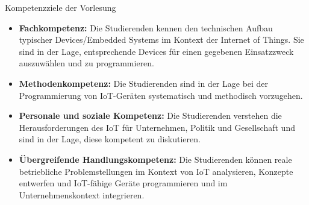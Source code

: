 \begin{frame}{Kompetenzziele der Vorlesung}
    \begin{itemize}
        \item \textbf{Fachkompetenz:} Die Studierenden kennen den technischen Aufbau typischer
        Devices/Embedded Systems im Kontext der Internet of Things. Sie sind in der Lage,
        entsprechende Devices für einen gegebenen Einsatzzweck auszuwählen und zu programmieren.
        \medskip

        \item \textbf{Methodenkompetenz:} Die Studierenden sind in der Lage bei der Programmierung
        von IoT-Geräten systematisch und methodisch vorzugehen.
        \medskip

        \item \textbf{Personale und soziale Kompetenz:} Die Studierenden verstehen die Herausforderungen
        des IoT für Unternehmen, Politik und Gesellschaft und sind in der Lage, diese kompetent zu diskutieren.
        \medskip

        \item \textbf{Übergreifende Handlungskompetenz:} Die Studierenden können reale betriebliche
        Problemstellungen im Kontext von IoT analysieren, Konzepte entwerfen und IoT-fähige Geräte
        programmieren und im Unternehmenskontext integrieren.
        \medskip
    \end{itemize}
\end{frame}


